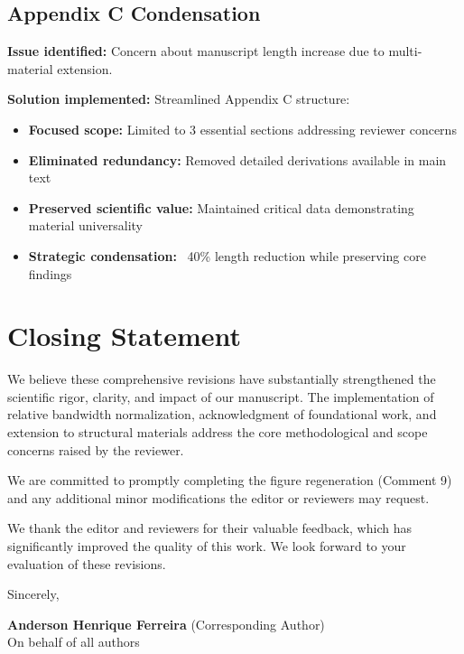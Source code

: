 \documentclass[11pt,a4paper]{article}
\begin{document}
\subsection*{Appendix C Condensation}

\textbf{Issue identified:} Concern about manuscript length increase due to multi-material extension.

\textbf{Solution implemented:} Streamlined Appendix C structure:
\begin{itemize}
    \item \textbf{Focused scope:} Limited to 3 essential sections addressing reviewer concerns
    \item \textbf{Eliminated redundancy:} Removed detailed derivations available in main text
    \item \textbf{Preserved scientific value:} Maintained critical data demonstrating material universality
    \item \textbf{Strategic condensation:} ~40\% length reduction while preserving core findings
\end{itemize}

\section*{Closing Statement}

We believe these comprehensive revisions have substantially strengthened the scientific rigor, clarity, and impact of our manuscript. The implementation of relative bandwidth normalization, acknowledgment of foundational work, and extension to structural materials address the core methodological and scope concerns raised by the reviewer.

We are committed to promptly completing the figure regeneration (Comment 9) and any additional minor modifications the editor or reviewers may request.

We thank the editor and reviewers for their valuable feedback, which has significantly improved the quality of this work. We look forward to your evaluation of these revisions.

\vspace{1cm}

Sincerely,

\vspace{1cm}

\textbf{Anderson Henrique Ferreira} (Corresponding Author)\\
On behalf of all authors
\end{document}
